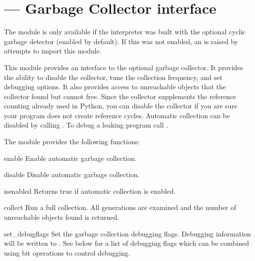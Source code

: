 \section{ ---
         Garbage Collector interface}


The  module is only available if the interpreter was built
with the optional cyclic garbage detector (enabled by default).  If
this was not enabled, an  is raised by attempts
to import this module.

This module provides an interface to the optional garbage collector.  It
provides the ability to disable the collector, tune the collection
frequency, and set debugging options.  It also provides access to
unreachable objects that the collector found but cannot free.  Since the
collector supplements the reference counting already used in Python, you
can disable the collector if you are sure your program does not create
reference cycles.  Automatic collection can be disabled by calling
.  To debug a leaking program call
.

The  module provides the following functions:

\begin{funcdesc}{enable}{}
Enable automatic garbage collection.
\end{funcdesc}

\begin{funcdesc}{disable}{}
Disable automatic garbage collection.
\end{funcdesc}

\begin{funcdesc}{isenabled}{}
Returns true if automatic collection is enabled.
\end{funcdesc}

\begin{funcdesc}{collect}{}
Run a full collection.  All generations are examined and the
number of unreachable objects found is returned.
\end{funcdesc}

\begin{funcdesc}{set_debug}{flags}
Set the garbage collection debugging flags.
Debugging information will be written to .  See below
for a list of debugging flags which can be combined using bit
operations to control debugging.
\end{funcdesc}

